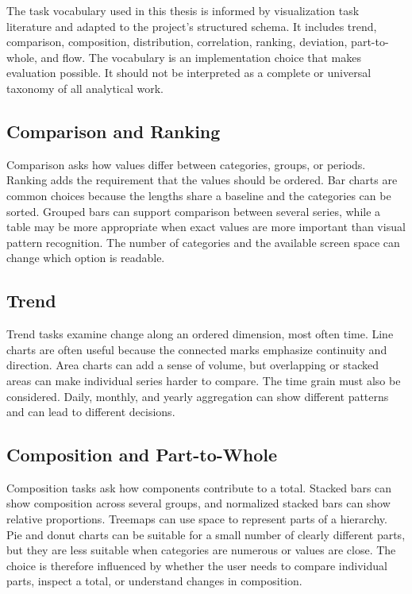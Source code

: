 The task vocabulary used in this thesis is informed by visualization task literature and adapted to the project's structured schema. It includes trend, comparison, composition, distribution, correlation, ranking, deviation, part-to-whole, and flow. The vocabulary is an implementation choice that makes evaluation possible. It should not be interpreted as a complete or universal taxonomy of all analytical work.

\subsection{Comparison and Ranking}

Comparison asks how values differ between categories, groups, or periods. Ranking adds the requirement that the values should be ordered. Bar charts are common choices because the lengths share a baseline and the categories can be sorted. Grouped bars can support comparison between several series, while a table may be more appropriate when exact values are more important than visual pattern recognition. The number of categories and the available screen space can change which option is readable.

\subsection{Trend}

Trend tasks examine change along an ordered dimension, most often time. Line charts are often useful because the connected marks emphasize continuity and direction. Area charts can add a sense of volume, but overlapping or stacked areas can make individual series harder to compare. The time grain must also be considered. Daily, monthly, and yearly aggregation can show different patterns and can lead to different decisions.

\subsection{Composition and Part-to-Whole}

Composition tasks ask how components contribute to a total. Stacked bars can show composition across several groups, and normalized stacked bars can show relative proportions. Treemaps can use space to represent parts of a hierarchy. Pie and donut charts can be suitable for a small number of clearly different parts, but they are less suitable when categories are numerous or values are close. The choice is therefore influenced by whether the user needs to compare individual parts, inspect a total, or understand changes in composition.

